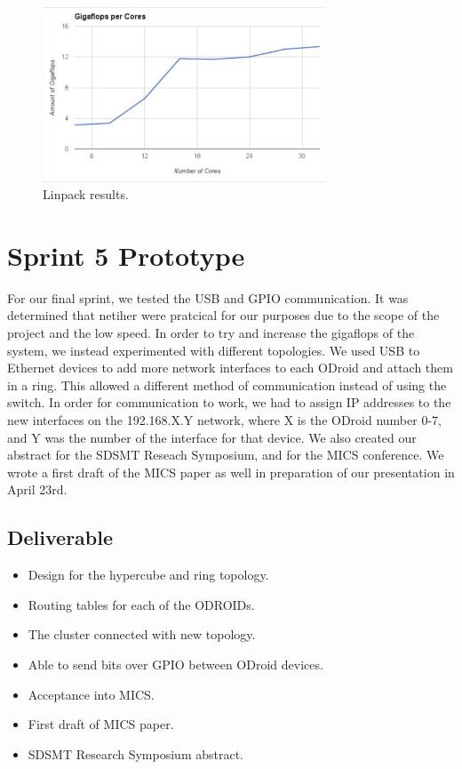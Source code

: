 \begin{figure}[tbh]
	\caption{Linpack results.}
	\centering
		\includegraphics[width=0.75\textwidth]{minimalgraph.JPG}
\end{figure}

\section{Sprint 5 Prototype}

For our final sprint, we tested the USB and GPIO communication. It was determined that netiher were pratcical for our purposes due to the scope of the project and the low speed. In order to try and increase the gigaflops of the system, we instead experimented with different topologies. We used USB to Ethernet devices to add more network interfaces to each ODroid and attach them in a ring. This allowed a different method of communication instead of using the switch. In order for communication to work, we had to assign IP addresses to the new interfaces on the 192.168.X.Y network, where X is the ODroid number 0-7, and Y was the number of the interface for that device. We also created our abstract for the SDSMT Reseach Symposium, and for the MICS conference. We wrote a first draft of the MICS paper as well in preparation of our presentation in April 23rd. 

\subsection{Deliverable}

\begin{itemize}
\item Design for the hypercube and ring topology.
\item Routing tables for each of the ODROIDs.
\item The cluster connected with new topology.
\item Able to send bits over GPIO between ODroid devices.
\item Acceptance into MICS.
\item First draft of MICS paper.
\item SDSMT Research Symposium abstract.
\end{itemize}


